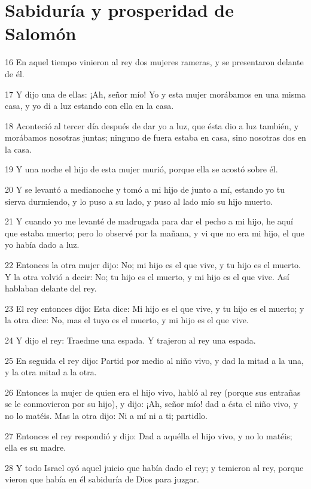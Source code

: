 \section*{Sabiduría y prosperidad de Salomón}

\par 16 En aquel tiempo vinieron al rey dos mujeres rameras, y se presentaron delante de él.
\par 17 Y dijo una de ellas: ¡Ah, señor mío! Yo y esta mujer morábamos en una misma casa, y yo di a luz estando con ella en la casa.
\par 18 Aconteció al tercer día después de dar yo a luz, que ésta dio a luz también, y morábamos nosotras juntas; ninguno de fuera estaba en casa, sino nosotras dos en la casa.
\par 19 Y una noche el hijo de esta mujer murió, porque ella se acostó sobre él.
\par 20 Y se levantó a medianoche y tomó a mi hijo de junto a mí, estando yo tu sierva durmiendo, y lo puso a su lado, y puso al lado mío su hijo muerto.
\par 21 Y cuando yo me levanté de madrugada para dar el pecho a mi hijo, he aquí que estaba muerto; pero lo observé por la mañana, y vi que no era mi hijo, el que yo había dado a luz.
\par 22 Entonces la otra mujer dijo: No; mi hijo es el que vive, y tu hijo es el muerto. Y la otra volvió a decir: No; tu hijo es el muerto, y mi hijo es el que vive. Así hablaban delante del rey.
\par 23 El rey entonces dijo: Esta dice: Mi hijo es el que vive, y tu hijo es el muerto; y la otra dice: No, mas el tuyo es el muerto, y mi hijo es el que vive.
\par 24 Y dijo el rey: Traedme una espada. Y trajeron al rey una espada.
\par 25 En seguida el rey dijo: Partid por medio al niño vivo, y dad la mitad a la una, y la otra mitad a la otra.
\par 26 Entonces la mujer de quien era el hijo vivo, habló al rey (porque sus entrañas se le conmovieron por su hijo), y dijo: ¡Ah, señor mío! dad a ésta el niño vivo, y no lo matéis. Mas la otra dijo: Ni a mí ni a ti; partidlo.
\par 27 Entonces el rey respondió y dijo: Dad a aquélla el hijo vivo, y no lo matéis; ella es su madre.
\par 28 Y todo Israel oyó aquel juicio que había dado el rey; y temieron al rey, porque vieron que había en él sabiduría de Dios para juzgar.

